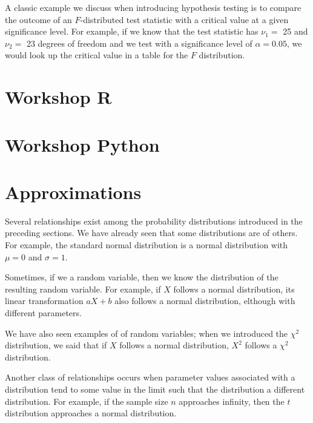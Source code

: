 A classic example we discuss when introducing hypothesis testing is to compare the outcome of an $F$-distributed test statistic with a critical value at a given significance level. For example, if we know that the test statistic has $\nu_1 = $ 25 and $\nu_2 = $ 23 degrees of freedom and we test with a significance level of $\alpha =  0.05$, we would look up the critical value in a table for the $F$ distribution.

\section{Workshop R} %
\label{sec:workshop02r}




\section{Workshop Python} %
\label{sec:workshop02p}






\section{Approximations} %
\label{sec:approximations}

Several relationships exist among the probability distributions introduced in the preceding sections. We have already seen that some distributions are  of others. For example, the standard normal distribution is a normal distribution with $\mu = 0$ and $\sigma = 1$.

Sometimes, if we  a random variable, then we know the distribution of the resulting random variable. For example, if $X$ follows a normal distribution, its linear transformation $aX + b$ also follows a normal distribution, elthough with different parameters.

We have also seen examples of  of random variables; when we introduced the $\chi^2$ distribution, we said that if $X$ follows a normal distribution, $X^2$ follows a $\chi^2$ distribution. 

\bigskip
Another class of relationships occurs when parameter values associated with a distribution tend to some value in the limit such that the distribution  a different distribution. For example, if the sample size $n$ approaches infinity, then the $t$ distribution approaches a normal distribution.

